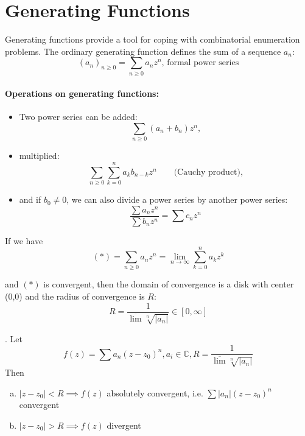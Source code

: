 

\section{Generating Functions}

Generating functions provide a tool for coping with combinatorial enumeration problems. The ordinary generating function defines the sum of a sequence $a_n$:
\[
	(a_n)_{n≥0} = \sum_{n≥0} a_n z^n \text{, formal power series}
\]
\paragraph{Operations on generating functions:}
\begin{itemize}
	\item Two power series can be added:
	\[
		\sum_{n≥0} (a_n + b_n) z^n \text{,}
	\]

	\item multiplied:
	\[
		\sum_{n≥0}\sum_{k=0}^n a_k b_{n-k} z^n \qquad \text{(Cauchy product),}
	\]

	\item and if $b_0 ≠ 0$, we can also divide a power series by another power series:
	\[
	    \frac{
	        \sum a_n z^n
	    }{
	        \sum b_n z^n
	    } =
	        \sum c_n z^n
	\]
\end{itemize}

If we have
\[
    (*) = \sum_{n≥0} a_n z^n = \lim_{n \to ∞} \sum_{k=0}^{n} a_k z^k
\]

and $(*)$ is convergent, then the domain of convergence is a disk with center (0,0) and the radius of convergence is $R$:
\[
    R = \frac1{\overline{\lim} \sqrt[n]{|a_n|}} \in [0, \infty]
\]

\Theorem.
Let
\[
    f(z) = \sum a_n (z-z_0)^n,
    a_i\in \mathbb{C},
    R = \frac{1}{\overline{\lim} \sqrt[n]{|a_n|}}
\]
Then
\begin{enumerate}[a)]
	\item $|z - z_0| < R \implies f(z)$ absolutely convergent, i.e.
	      $\sum |a_n| (z-z_0)^n$ convergent

	\item $|z - z_0| > R \implies f(z)$ divergent
\end{enumerate}

